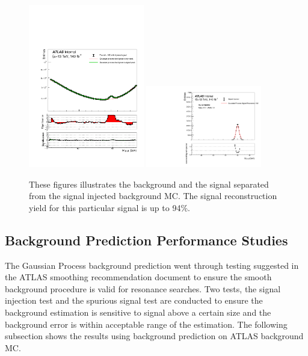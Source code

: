 \begin{figure}[!htb]
    \begin{center}
        \includegraphics[width=0.45\textwidth]{figures/chapter_dimuon//BackgroundSeparated}        
        \includegraphics[width=0.45\textwidth]{figures/chapter_dimuon/SignalSeparated}        
        \caption{
            These figures illustrates the background and the signal separated from the signal injected background MC. The signal reconstruction yield for this particular signal is up to 94\%.
        }
        \label{fig:dimuonmass}
    \end{center}
\end{figure}
\FloatBarrier


\subsection{Background Prediction Performance Studies}
The Gaussian Process background prediction went through testing suggested in the ATLAS smoothing recommendation document to ensure the smooth background procedure is valid for resonance searches. Two tests, the signal injection test and the spurious signal test are conducted to ensure the background estimation is sensitive to signal above a certain size and the background error is within acceptable range of the estimation. The following subsection shows the results using background prediction on ATLAS background MC.  

